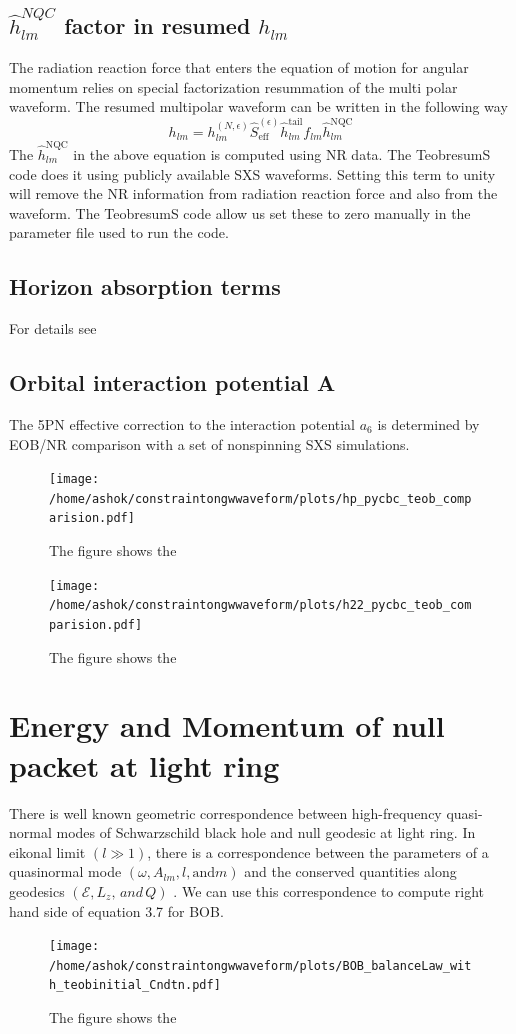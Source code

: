 \documentclass[prd,preprintnumbers,onecolumn,eqsecnum,floatfix,letter]{revtex4}
\begin{document}
\subsection{$\hat{h}^{NQC}_{lm}$ factor in resumed $h_{lm}$} 
The radiation reaction force that enters the equation of motion for angular momentum relies on special factorization resummation of the multi polar waveform. The resumed multipolar waveform can be written in the following way
\begin{equation}
	h_{lm} = h_{lm}^{\left(N, \epsilon\right)}\hat{S}_{\text{eff}}^{\left(\epsilon\right)}\hat{h}^{\text{tail}}_{lm}f_{lm}\hat{h}^{\text{NQC}}_{lm}
\end{equation} 
The $\hat{h}^{\text{NQC}}_{lm}$ in the above equation is computed using NR data. The TeobresumS code does it using publicly available SXS waveforms. Setting this term to unity will remove the NR information from radiation reaction force and also from the waveform. The TeobresumS code allow us set these to zero manually in the parameter file used to run the code.
\subsection{Horizon absorption terms} 
For details see \cite{Bernuzzi2012PhRvD}
\subsection{Orbital interaction potential A}
The 5PN effective correction to the interaction potential \cite{Nagar2016} $a_6$ is determined by EOB/NR comparison with a set of nonspinning SXS simulations.
\begin{figure}
	\texttt{[image: /home/ashok/constraintongwwaveform/plots/hp\_pycbc\_teob\_comparision.pdf]}
	\caption{The figure shows the }
	\label{fig:teobhp}
\end{figure}

\begin{figure}
	\texttt{[image: /home/ashok/constraintongwwaveform/plots/h22\_pycbc\_teob\_comparision.pdf]}
	\caption{The figure shows the }
	\label{fig:teobh22}
\end{figure} 

 
\section{Energy and Momentum of null packet at light ring}
There is well known geometric correspondence between high-frequency quasi-normal modes of Schwarzschild black hole and null geodesic at light ring. In eikonal limit $\left(l\gg1\right)$, there is a correspondence between the parameters of a quasinormal mode $\left(\omega, A_{lm}, l, \text{and} m\right)$ and the conserved quantities along geodesics $\left(\mathcal{E}, \mathit{L_z}, \,and\, Q\right)$ \cite{Yang2012PhRvD}. We can use this correspondence to compute right hand side of equation 3.7 for BOB. 
\begin{figure}
 	\texttt{[image: /home/ashok/constraintongwwaveform/plots/BOB\_balanceLaw\_with\_teobinitial\_Cndtn.pdf]}
 	\caption{The figure shows the }
 	\label{fig:teobh22}
\end{figure} 
\end{document}
